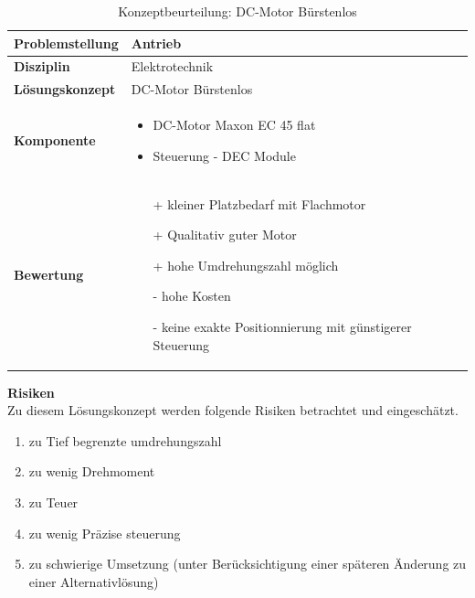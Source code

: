 \documentclass[../../../main.tex]{subfiles}
\begin{document}
    \begin{flushleft}
        \begin{table}[H]
        \begin{tabular}{ | l | p{11cm} |}
        \hline
        \textbf{Problemstellung} & Antrieb \\ \hline
        \textbf{Disziplin} & Elektrotechnik \\ \hline
        \textbf{Lösungskonzept} & DC-Motor Bürstenlos\\ \hline
        \textbf{Komponente} & \begin{itemize}
            \item DC-Motor Maxon EC 45 flat
            \item Steuerung - DEC Module
            \end{itemize}\\ \hline
        \textbf{Bewertung} &  \begin{itemize}
                                \item[+] kleiner Platzbedarf mit Flachmotor
                                \item[+] Qualitativ guter Motor
                                \item[+] hohe Umdrehungszahl möglich 
                                \item[-] hohe Kosten 
                                \item[-] keine exakte Positionnierung mit günstigerer Steuerung
                              \end{itemize} \\ \hline
        \end{tabular}
        \caption{Konzeptbeurteilung: DC-Motor Bürstenlos}
        \label{tab:antr_konzept_dcMotor_buerstenlos}
    \end{table}
    \end{flushleft}

    \textbf{Risiken}\\
    Zu diesem Lösungskonzept werden folgende Risiken betrachtet und eingeschätzt.
    \begin{enumerate}[I]
        \item zu Tief begrenzte umdrehungszahl
        \item zu wenig Drehmoment
        \item zu Teuer
        \item zu wenig Präzise steuerung
        \item zu schwierige Umsetzung (unter Berücksichtigung einer späteren Änderung zu einer Alternativlösung)        
    \end{enumerate}
\end{document}
